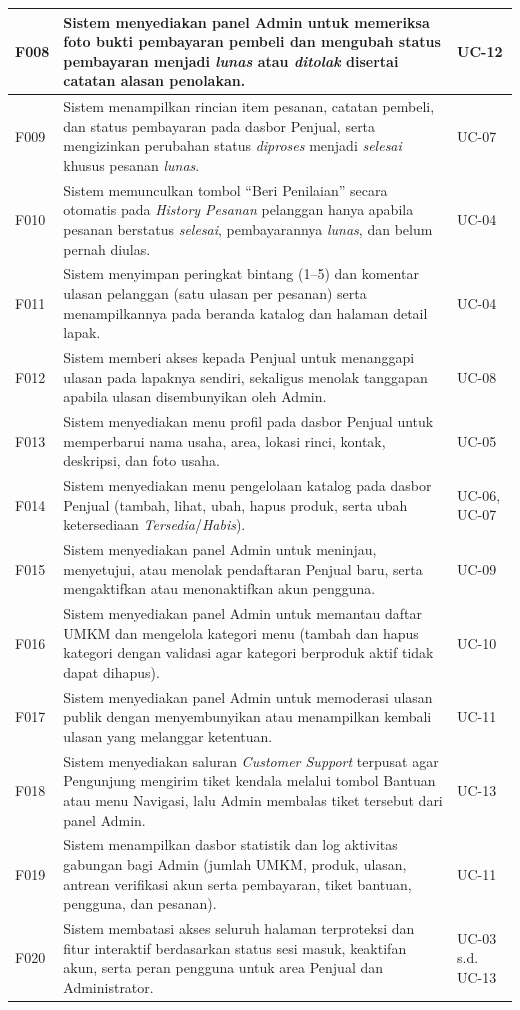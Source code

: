 \begin{longtable}{|C{1.4cm}|L{\dimexpr\textwidth-1.4cm-2.2cm-6\arrayrulewidth\relax}|C{2.2cm}|}
\hline
F008 & Sistem menyediakan panel Admin untuk memeriksa foto bukti pembayaran pembeli dan mengubah status pembayaran menjadi \textit{lunas} atau \textit{ditolak} disertai catatan alasan penolakan. & UC-12 \\
\hline
F009 & Sistem menampilkan rincian item pesanan, catatan pembeli, dan status pembayaran pada dasbor Penjual, serta mengizinkan perubahan status \textit{diproses} menjadi \textit{selesai} khusus pesanan \textit{lunas}. & UC-07 \\
\hline
F010 & Sistem memunculkan tombol ``Beri Penilaian'' secara otomatis pada \textit{History Pesanan} pelanggan hanya apabila pesanan berstatus \textit{selesai}, pembayarannya \textit{lunas}, dan belum pernah diulas. & UC-04 \\
\hline
F011 & Sistem menyimpan peringkat bintang (1--5) dan komentar ulasan pelanggan (satu ulasan per pesanan) serta menampilkannya pada beranda katalog dan halaman detail lapak. & UC-04 \\
\hline
F012 & Sistem memberi akses kepada Penjual untuk menanggapi ulasan pada lapaknya sendiri, sekaligus menolak tanggapan apabila ulasan disembunyikan oleh Admin. & UC-08 \\
\hline
F013 & Sistem menyediakan menu profil pada dasbor Penjual untuk memperbarui nama usaha, area, lokasi rinci, kontak, deskripsi, dan foto usaha. & UC-05 \\
\hline
F014 & Sistem menyediakan menu pengelolaan katalog pada dasbor Penjual (tambah, lihat, ubah, hapus produk, serta ubah ketersediaan \textit{Tersedia}/\textit{Habis}). & UC-06, UC-07 \\
\hline
F015 & Sistem menyediakan panel Admin untuk meninjau, menyetujui, atau menolak pendaftaran Penjual baru, serta mengaktifkan atau menonaktifkan akun pengguna. & UC-09 \\
\hline
F016 & Sistem menyediakan panel Admin untuk memantau daftar UMKM dan mengelola kategori menu (tambah dan hapus kategori dengan validasi agar kategori berproduk aktif tidak dapat dihapus). & UC-10 \\
\hline
F017 & Sistem menyediakan panel Admin untuk memoderasi ulasan publik dengan menyembunyikan atau menampilkan kembali ulasan yang melanggar ketentuan. & UC-11 \\
\hline
F018 & Sistem menyediakan saluran \textit{Customer Support} terpusat agar Pengunjung mengirim tiket kendala melalui tombol Bantuan atau menu Navigasi, lalu Admin membalas tiket tersebut dari panel Admin. & UC-13 \\
\hline
F019 & Sistem menampilkan dasbor statistik dan log aktivitas gabungan bagi Admin (jumlah UMKM, produk, ulasan, antrean verifikasi akun serta pembayaran, tiket bantuan, pengguna, dan pesanan). & UC-11 \\
\hline
F020 & Sistem membatasi akses seluruh halaman terproteksi dan fitur interaktif berdasarkan status sesi masuk, keaktifan akun, serta peran pengguna untuk area Penjual dan Administrator. & UC-03 s.d. UC-13 \\
\hline
\end{longtable}

